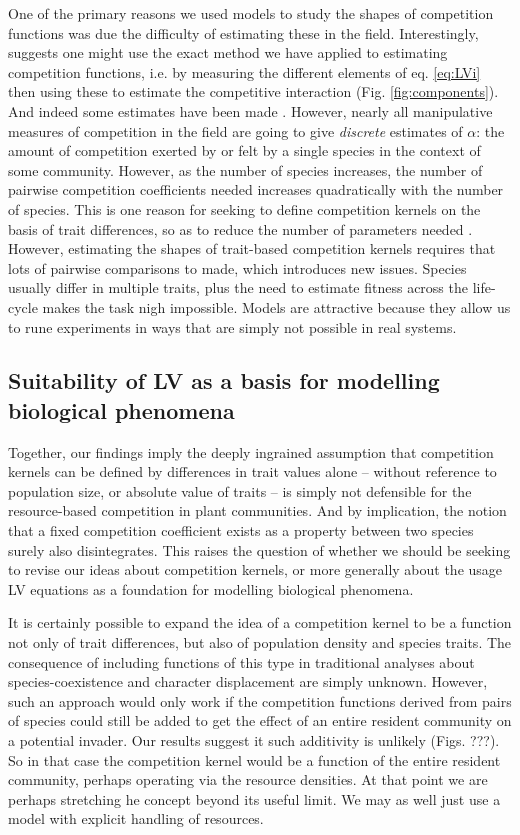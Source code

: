 \documentclass[a4paper,11pt]{article}
\begin{document}
One of the primary reasons we used models to study the shapes of competition
functions was due the difficulty of estimating these in the field.
Interestingly, \citet{Ricklefs-1973} suggests one might use the exact  method
we have applied to estimating competition functions, i.e. by measuring the
different elements of eq. \ref{eq:LVi} then using these to estimate the
competitive interaction (Fig. \ref{fig:components}). And indeed some
estimates have been made \citep{Ricklefs-1973, kraft-2015}. However, nearly all
manipulative measures of competition in the field are going to give
\emph{discrete} estimates of $\alpha$: the amount of competition exerted by
or felt by a single species in the context of some community. However, as
the number of species increases, the number of pairwise competition
coefficients needed increases quadratically with the number of species. This is
one reason for seeking to define competition kernels on the basis of
trait differences, so as to reduce the number of parameters needed \citep{kraft-2015}.
However, estimating the shapes of trait-based competition kernels requires
that lots of pairwise comparisons to made, which introduces new issues.
Species usually differ in multiple traits, plus the need to estimate fitness
across the life-cycle makes the task nigh impossible. Models are attractive
because they allow us to rune experiments in ways that are simply not
possible in real systems. 

\subsection{Suitability of LV as a basis for modelling biological phenomena}

Together, our findings imply the deeply ingrained assumption that
competition kernels can be defined by differences in trait values
alone -- without reference to population size, or absolute value of traits
-- is simply not defensible for the resource-based competition in plant
communities. And by implication, the notion that a fixed competition
coefficient exists as a property between two species surely also 
disintegrates. This raises the question of whether we should be seeking to
revise our ideas about competition kernels, or more generally about the
usage LV equations as a foundation for modelling biological phenomena.

It is certainly possible to expand the idea of a competition kernel to be a
function not only of trait differences, but also of population density and
species traits. The consequence of including functions of this type in
traditional analyses about species-coexistence and character displacement are
simply unknown. However, such an approach would only work if the competition
functions derived from pairs of species could still be added to get the effect
of an entire resident community on a potential invader. Our results suggest it
such additivity is unlikely (Figs. ???). So in that case the competition
kernel would be a function of the entire resident community, perhaps operating
via the resource densities. At that point we are perhaps stretching he concept
beyond its useful limit. We may as well just use a model with explicit
handling of resources.
\end{document}
